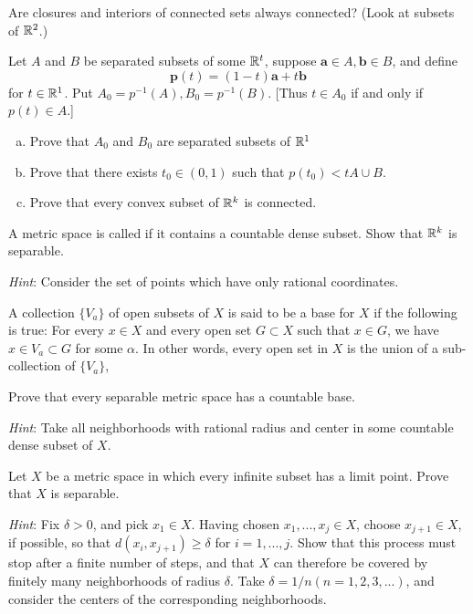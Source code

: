\begin{myExercise}
    \label{ex:2.20}
    Are closures and interiors of connected sets always connected? 
    (Look at subsets of ${\protect\mathbb R}^2$.)
\end{myExercise}

\begin{myExercise}
    \label{ex:2.21}
    Let $A$ and $B$ be separated subsets of some ${\protect\mathbb R}^t$, 
    suppose $\mathbf{a} \in A, \mathbf{b} \in B$,
    and define 
    \begin{equation*}
        \mathbf{p}(t) = (1 - t)\mathbf{a} + t\mathbf{b}
    \end{equation*}
    for $t \in {\protect\mathbb R}^1$. 
    Put $A_0= p^{-1}(A), B_0= p^{-1}(B)$. 
    [Thus $t \in A_0$ if and only if $p(t) \in A$.]
    \begin{enumerate}[(a)]
        \item Prove that $A_0$ and $B_0$ are separated subsets of ${\protect\mathbb R}^1$
        \item Prove that there exists $t_0 \in (0, 1)$ such that $p(t_0) <t A \cup B$.
        \item Prove that every convex subset of ${\protect\mathbb R}^k$ is connected.
    \end{enumerate}
\end{myExercise}

\begin{myExercise}
    \label{ex:2.22}
    A metric space is called  if it contains a countable dense subset. 
    Show that ${\protect\mathbb R}^k$ is separable. 
    
    \emph{Hint}: Consider the set of points which have only rational coordinates.
\end{myExercise}

\begin{myExercise}
    \label{ex:2.23}
    A collection $\{V_a\}$ of open subsets of $X$ is said to be a base for $X$ 
    if the following is true: 
    For every $x \in X$ and every open set $G \subset X$ such that $x \in G$, 
    we have $x \in V_a \subset G$ for some $\alpha$. 
    In other words, every open set in $X$ is the union of a 
    sub-collection of $\{V_a\}$,
    
    Prove that every separable metric space has a countable base. 

    \emph{Hint}: Take all neighborhoods with rational radius 
    and center in some countable dense subset of $X$.
\end{myExercise}

\begin{myExercise}
    \label{ex:2.24}
    Let $X$ be a metric space in which every infinite subset has a limit point. 
    Prove that $X$ is separable. 
    
    \emph{Hint}: Fix $\delta > 0$, and pick $x_1 \in X$. 
    Having chosen $x_1, ... , x_j \in X$,
    choose $x_{j+1} \in X$, 
    if possible, so that $d(x_i, x_{j+1})\geq \delta$ for $i = 1, ... ,j$. 
    Show that this process must stop after a finite number of steps, 
    and that $X$ can therefore be covered by finitely many neighborhoods of radius $\delta$. 
    Take $\delta = 1/n (n = 1, 2, 3, ... )$, 
    and consider the centers of the corresponding neighborhoods.
\end{myExercise}


